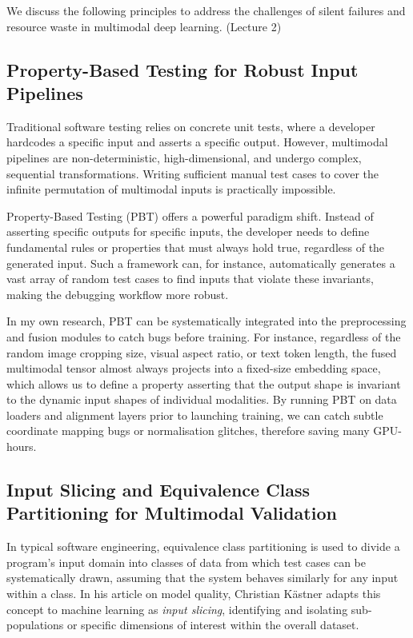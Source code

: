 \documentclass[11pt,a4paper]{article}
\begin{document}
We discuss the following principles to address the challenges of silent failures and resource waste in multimodal deep learning. (Lecture 2)

\subsection{Property-Based Testing for Robust Input Pipelines}

Traditional software testing relies on concrete unit tests, where a developer hardcodes a specific input and asserts a specific output. However, multimodal pipelines are non-deterministic, high-dimensional, and undergo complex, sequential transformations. Writing sufficient manual test cases to cover the infinite permutation of multimodal inputs is practically impossible.

Property-Based Testing (PBT) offers a powerful paradigm shift. Instead of asserting specific outputs for specific inputs, the developer needs to define fundamental rules or properties that must always hold true, regardless of the generated input. Such a framework can, for instance, automatically generates a vast array of random test cases to find inputs that violate these invariants, making the debugging workflow more robust.

In my own research, PBT can be systematically integrated into the preprocessing and fusion modules to catch bugs before training. For instance, regardless of the random image cropping size, visual aspect ratio, or text token length, the fused multimodal tensor almost always projects into a fixed-size embedding space, which allows us to define a property asserting that the output shape is invariant to the dynamic input shapes of individual modalities. By running PBT on data loaders and alignment layers prior to launching training, we can catch subtle coordinate mapping bugs or normalisation glitches, therefore saving many GPU-hours.


\subsection{Input Slicing and Equivalence Class Partitioning for Multimodal Validation}

In typical software engineering, equivalence class partitioning is used to divide a program's input domain into classes of data from which test cases can be systematically drawn, assuming that the system behaves similarly for any input within a class. In his article on model quality, Christian K{\"a}stner \cite{kaestner2023slicing} adapts this concept to machine learning as \textit{input slicing}, identifying and isolating sub-populations or specific dimensions of interest within the overall dataset.
\end{document}
